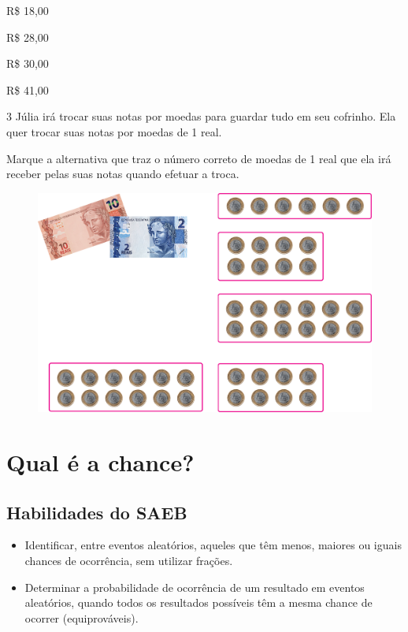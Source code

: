 \begin{escolha}

\item
  R\$ 18,00
\item
  R\$ 28,00
\item
  R\$ 30,00
\item
  R\$ 41,00
\end{escolha}

\num{3} Júlia irá trocar suas notas por moedas para guardar tudo em seu
cofrinho. Ela quer trocar suas notas por moedas de 1 real.

Marque a
alternativa que traz o número correto de moedas de 1 real que ela
irá receber pelas suas notas quando efetuar a troca.

\begin{figure}[htpb!]
\centering
\includegraphics[width=.65\textwidth]{./media/image74.png}
\end{figure}

\chapter{Qual é a chance?}

\section*{Habilidades do SAEB}

\begin{itemize}
\item Identificar, entre eventos aleatórios, aqueles que têm menos, maiores ou
iguais chances de ocorrência, sem utilizar frações.

\item Determinar a probabilidade de ocorrência de um resultado em eventos
aleatórios, quando todos os resultados possíveis têm a mesma chance de
ocorrer (equiprováveis).
\end{itemize}

